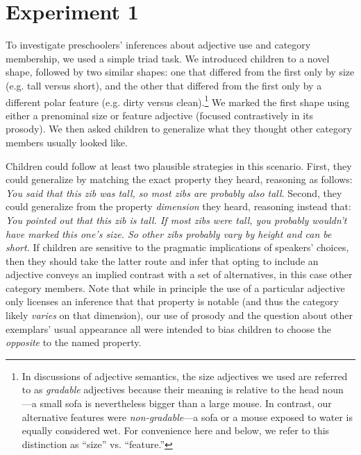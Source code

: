 \documentclass[man]{apa2}
\begin{document}
\section{Experiment 1}


To investigate preschoolers' inferences about adjective use and category membership, we used a simple triad task.  We introduced children to a novel shape, followed by two similar shapes: one that differed from the first only by size (e.g. tall versus short), and the other that differed from the first only by a different polar feature (e.g. dirty versus clean).\footnote{In discussions of adjective semantics, the size adjectives we used are referred to as \emph{gradable} adjectives because their meaning is relative to the head noun \cite{kennedy2012}---a small sofa is nevertheless bigger than a large mouse. In contrast, our alternative features were \emph{non-gradable}---a sofa or a mouse exposed to water is equally considered wet. For convenience here and below, we refer to this distinction as ``size'' vs. ``feature.''} We marked the first shape using either a prenominal size or feature adjective (focused contrastively in its prosody). We then asked children to generalize what they thought other category members usually looked like. 

Children could follow at least two plausible strategies in this scenario. First, they could generalize by matching the exact property they heard, reasoning as follows: \emph{You said that this zib was tall, so most zibs are probably also tall}. Second, they could generalize from the property \emph{dimension} they heard, reasoning instead that: \emph{You pointed out that this zib is tall. If most zibs were tall, you probably wouldn't have marked this one's size. So other zibs probably vary by height and can be short.} If children are sensitive to the pragmatic implications of speakers' choices, then they should take the latter route and infer that opting to include an adjective conveys an implied contrast with a set of alternatives, in this case other category members. Note that while in principle the use of a particular adjective only licenses an inference that that property is notable (and thus the category likely \emph{varies} on that dimension), our use of prosody and the question about other exemplars' usual appearance all were intended to bias children to choose the \emph{opposite} to the named property.


\end{document}

